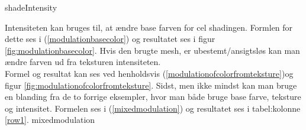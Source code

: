  {shadeIntensity} 

Intensiteten kan bruges til, at ændre base farven for cel shadingen. Formlen for dette ses i
(\ref{modulationbasecolor}) og resultatet ses i figur \ref{fig:modulationbasecolor}. 
Hvis den brugte mesh, er ubestemt/ansigtsløs kan man ændre farven ud fra teksturen
intensiteten.
\\
Formel og resultat kan ses ved henholdsvis
(\ref{modulationofcolorfromteksture})og figur \ref{fig:modulationofcolorfromteksture}. Sidst,
men ikke mindst kan man bruge en blanding fra de to forrige eksempler, hvor man både bruge base
farve, teksture og intensitet. Formelen ses i (\ref{mixedmodulation}) og resultatet ses i tabel:kolonne \ref{row1}.
 {mixedmodulation}

